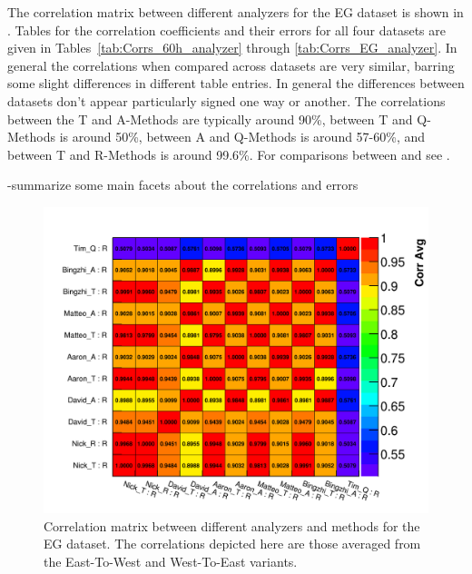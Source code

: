 The correlation matrix between different analyzers for the EG dataset is shown in . Tables for the correlation coefficients and their errors for all four datasets are given in Tables~\ref{tab:Corrs_60h_analyzer} through \ref{tab:Corrs_EG_analyzer}. In general the correlations when compared across datasets are very similar, barring some slight differences in different table entries. In general the differences between datasets don't appear particularly signed one way or another. The correlations between the T and A-Methods are typically around 90\%, between T and Q-Methods is around 50\%, between A and Q-Methods is around 57-60\%, and between T and R-Methods is around 99.6\%. For comparisons between \RE and \RW see .


-summarize some main facets about the correlations and errors



\begin{figure}[]
\centering
\includegraphics[width=\textwidth]{Avg_CorrelationMatrix_R_R}
\caption{Correlation matrix between different analyzers and methods for the EG dataset. The correlations depicted here are those averaged from the East-To-West and West-To-East variants.}
\label{fig:corrMatAnalyzer}
\end{figure}



